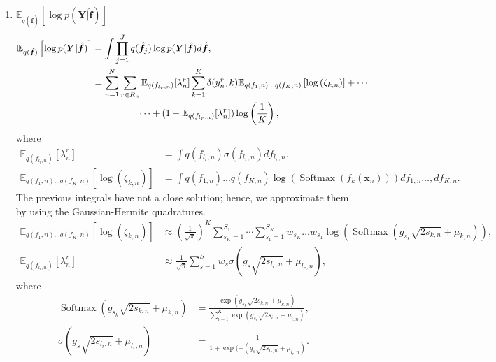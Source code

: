 \documentclass[9pt]{article}
\providecommand{\ve}[1]{{\bm{#1}}}%
\providecommand{\mat}[1]{{\bm{#1}}} %
\providecommand{\ve}[1]{{\mathbf{#1}}}
\providecommand{\mat}[1]{{\mathbf{#1}}}
\begin{document}
\begin{enumerate}
	\item $\mathbb{E}_{q(\hat{\ve{f}})}\left[\log p(\mat{Y}|\hat{\ve{f}})\right]$
	\begin{align}
	\notag \mathbb{E}_{q(\hat{\ve{f}})}\left[\log p(\mat{Y}|\hat{\ve{f}})\right] &=\int \prod_{j=1}^{J}q(\hat{\ve{f}}_j)\log p(\mat{Y}|\hat{\ve{f}})d\hat{\ve{f}}, \\
	\notag&= \sum_{n=1}^{N}\sum_{r\in R_n} \mathbb{E}_{q(f_{l_r,n})}[{\lambda}_n^r]\sum_{k=1}^{K}\delta(y_n^r,k)\mathbb{E}_{q(f_1,n)\dots q(f_K,n)}\left[\log\left(\zeta_{k,n}\right)\right]+\cdots\\
	& \hspace{1.7cm}\cdots+ (1-\mathbb{E}_{q(f_{l_r,n})}[{\lambda}_n^r])\log\left(\frac{1}{K}\right),
	\end{align}
	where 
	\begin{align}
	\mathbb{E}_{q(f_{l_r,n})}[{\lambda}_n^r] &= \int q(f_{l_r,n})\sigma(f_{l_r,n})df_{l_r,n}.\\
	\mathbb{E}_{q(f_1,n)\dots q(f_K,n)}\left[\log\left(\zeta_{k,n}\right)\right]&= \int q(f_{1,n})...q(f_{K,n}) \log(\operatorname{Softmax}\left(f_k(\ve{x}_n)\right))df_{1,n}\dots,df_{K,n}.
	\end{align}
	The previous integrals have not a close solution; hence, we approximate them by using the Gaussian-Hermite quadratures. 
	\begin{align}
	\label{eq:VarExlogzita}
	\mathbb{E}_{q(f_1,n)\dots q(f_K,n)}\left[\log\left(\zeta_{k,n}\right)\right]&\approx \left(\frac{1}{\sqrt{\pi}}\right)^{K}\sum_{s_K=1}^{S_1}\cdots \sum_{s_1=1}^{S_K} w_{s_K}\dots w_{s_1} \log\left(\operatorname{Softmax}\left(g_{s_k}\sqrt{2s_{k,n}} + \mu_{k,n}\right)\right),\\
	\label{eq:VarExLambda}
	\mathbb{E}_{q(f_{l_r,n})}[{\lambda}_n^r] &\approx \frac{1}{\sqrt{\pi}}\sum_{s=1}^{S}w_s \sigma\left(g_s\sqrt{2s_{l_r,n}}  + \mu_{l_r,n}\right),
	\end{align}
	where
	\begin{align}
	\operatorname{Softmax}\left(g_{s_k}\sqrt{2s_{k,n}} + \mu_{k,n}\right) &=\frac{\exp(g_{s_k}\sqrt{2s_{k,n}} + \mu_{k,n})}{\sum_{i=1}^{K}\exp(g_{s_i}\sqrt{2s_{i,n}} + \mu_{i,n})},\\
	\sigma\left(g_{s}\sqrt{2s_{l_r,n}} + \mu_{l_r,n}\right) &=\frac{1}{1+\exp(-(g_{s}\sqrt{2s_{l_r,n}} + \mu_{l_r,n})}.
	\end{align}
	

\end{enumerate}
\end{document}
